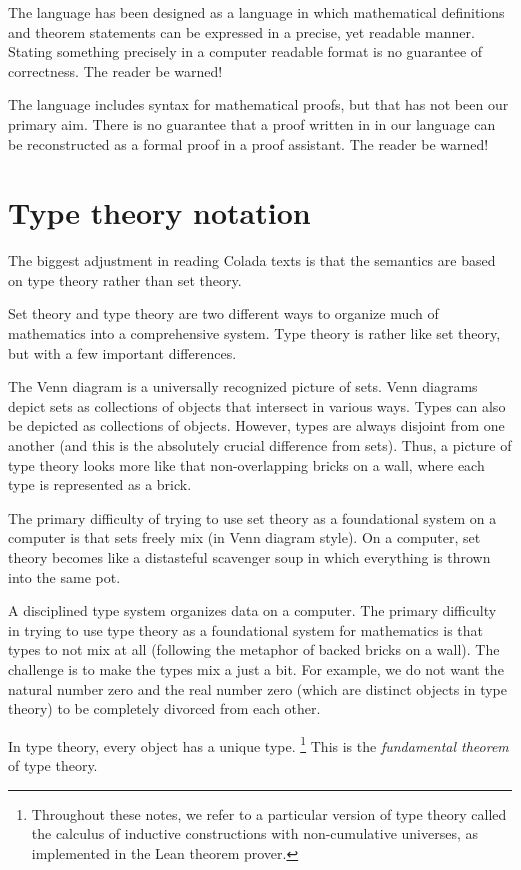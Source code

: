 \documentclass[12pt]{article}
\numberwithin{definition}{section}
\begin{document}
The language has been designed as a language in which mathematical
definitions and theorem statements can be expressed in a precise,
yet readable manner.   Stating something precisely in a computer
readable format is no guarantee of correctness.  The reader be warned!

The language includes syntax for mathematical
proofs, but that has not been our primary aim.  There is no guarantee
that a proof written in in our language can be reconstructed as a formal
proof in a proof assistant. The reader be warned!

\section{Type theory notation}

The biggest adjustment in reading Colada texts is that the semantics
are based on type theory rather than set theory.

Set theory and type theory are two different ways to organize much of
mathematics into a comprehensive system.  Type theory is rather like
set theory, but with a few important differences.

The Venn diagram is a universally recognized picture of sets. Venn
diagrams depict sets as collections of objects that intersect in
various ways. Types can also be depicted as collections of objects.
However, types are always disjoint from one another (and this is the
absolutely crucial difference from sets).  Thus, a picture of type
theory looks more like that non-overlapping bricks on a wall, where
each type is represented as a brick.

The primary difficulty of trying to use set theory as a foundational
system on a computer is that sets freely mix (in Venn diagram style).
On a computer, set theory becomes like a distasteful scavenger soup in which
everything is thrown into the same pot.

A disciplined type system organizes data on a computer.  The primary
difficulty in trying to use type theory as a foundational system for
mathematics is that types to not mix at all (following the metaphor of
backed bricks on a wall).  The challenge is to make the types mix a
just a bit.  For example, we do not want the natural number zero and
the real number zero (which are distinct objects in type theory) to be
completely divorced from each other.

In type theory, every object has a unique type.%
%
\footnote{Throughout these notes, we refer to a particular version of
  type theory called the calculus of inductive constructions with
  non-cumulative universes, as implemented in the Lean theorem
  prover.}
%
This is the \emph{fundamental theorem} of type theory.
\end{document}
